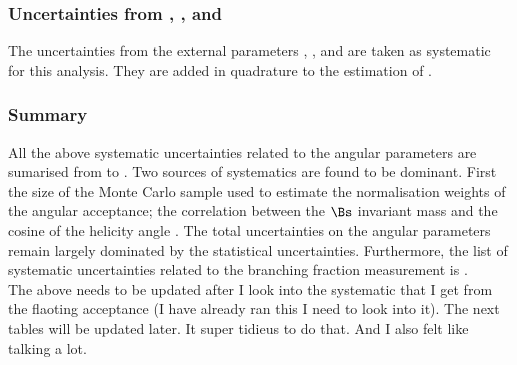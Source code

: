 \subsubsection{Uncertainties from \fdfs, \BRof\BdJpsiKst, and \BRof\BsJpsiPhi}
The uncertainties from the external parameters \fdfs, \BRof\BdJpsiKst, and \BRof\BsJpsiPhi are 
taken as systematic for this analysis. They are added in quadrature to the estimation of 
\BRof\BsJpsiKst.

\subsubsection{Summary}
\label{systSummary}
All the above systematic uncertainties related to the angular parameters are sumarised from 
to . Two sources of systematics are found to be dominant. First the size of the Monte
Carlo sample used to estimate the normalisation weights of the angular acceptance; the correlation between the $\Bs$ invariant
mass and the cosine of the helicity angle \thetamu. The total uncertainties on the angular parameters remain largely dominated
by the statistical uncertainties. Furthermore, the list of systematic uncertainties related to the branching fraction measurement
is .\\
{\color{red} The above needs to be updated after I look into the systematic that I get from the flaoting acceptance (I
have already ran this I need to look into it). The next tables will be updated later. It super tidieus to do that. 
And I also felt like talking a lot.}


